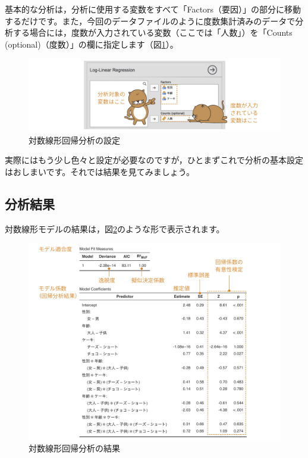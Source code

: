 \documentclass[
  12pt,
  a5jpaper,
  lualatex, ja=standard]{bxjsbook}
\begin{document}
基本的な分析は，分析に使用する変数をすべて「Factors（要因）」の部分に移動するだけです。また，今回のデータファイルのように度数集計済みのデータで分析する場合には，度数が入力されている変数（ここでは「人数」）を「Counts (optional)（度数）」の欄に指定します（図\ref{fig:frequencies-loglin-setvar}）。

\begin{figure}[!ht]

{\centering \includegraphics[width=1\linewidth]{images/frequencies/loglin-setvar} 

}

\caption{対数線形回帰分析の設定}\label{fig:frequencies-loglin-setvar}
\end{figure}

実際にはもう少し色々と設定が必要なのですが，ひとまずこれで分析の基本設定はおしまいです。それでは結果を見てみましょう。

\hypertarget{sub:frequencies-loglin-results}{%
\subsection{分析結果}\label{sub:frequencies-loglin-results}}

対数線形モデルの結果は，図\ref{fig:frequencies-loglin-results}のような形で表示されます。

\begin{figure}[!ht]

{\centering \includegraphics[width=1\linewidth]{images/frequencies/loglin-results} 

}

\caption{対数線形回帰分析の結果}\label{fig:frequencies-loglin-results}
\end{figure}
\end{document}
